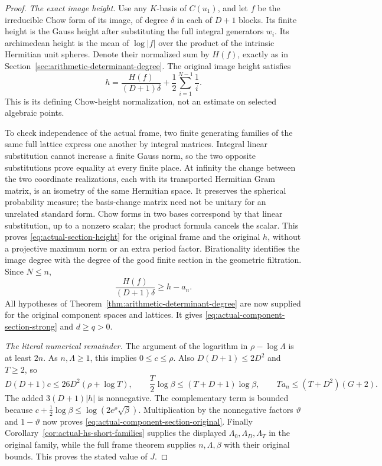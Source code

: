\begin{proof}
\emph{The exact image height.}
Use any $K$-basis of $C(u_1)$, and let $f$ be the irreducible Chow
form of its image, of degree $\delta$ in each of $D+1$ blocks.
Its finite height is the Gauss height after substituting the full
integral generators $w_i$.  Its archimedean height is the mean of
$\log|f|$ over the product of the intrinsic Hermitian unit spheres.
Denote their normalized sum by $H(f)$, exactly as in
Section~\ref{sec:arithmetic-determinant-degree}.  The original image
height satisfies
\begin{equation}\label{eq:actual-section-height}
       h=\frac{H(f)}{(D+1)\delta}
                   +\frac12\sum_{i=1}^{N-1}\frac1i .
\end{equation}
This is its defining Chow-height normalization, not an estimate on
selected algebraic points.

To check independence of the actual frame, two finite generating
families of the same full lattice express one another by integral
matrices.  Integral linear substitution cannot increase a finite
Gauss norm, so the two opposite substitutions prove equality at
every finite place.  At infinity the change between the two coordinate
realizations, each with its transported Hermitian Gram matrix, is
an isometry of the same Hermitian space.  It preserves the spherical
probability measure; the basis-change matrix need not be unitary
for an unrelated standard form.  Chow forms in two bases correspond by that
linear substitution, up to a nonzero scalar; the product formula
cancels the scalar.  This proves \eqref{eq:actual-section-height}
for the original frame and the original $h$, without a projective
maximum norm or an extra period factor.  Birationality identifies
the image degree with the degree of the good finite section in
the geometric filtration.  Since $N\le n$,
\[
        \frac{H(f)}{(D+1)\delta}\ge h-a_n.
\]
All hypotheses of Theorem~\ref{thm:arithmetic-determinant-degree}
are now supplied for the original component spaces and lattices.
It gives \eqref{eq:actual-component-section-strong} and $d\ge q>0$.

\emph{The literal numerical remainder.}
The argument of the logarithm in $\rho-\log\Lambda$ is at least
$2n$.  As $n,\Lambda\ge1$, this implies $0\le c\le\rho$.
Also $D(D+1)\le2D^2$ and $T\ge2$, so
\[
 D(D+1)c\le26D^2(\rho+\log T),\qquad
 \frac T2\log\beta\le(T+D+1)\log\beta,\qquad
 Ta_n\le(T+D^2)(G+2).
\]
The added $3(D+1)|h|$ is nonnegative.  The complementary term
is bounded because
$c+\tfrac12\log\beta\le
\log(2e^\rho\sqrt\beta)$.
Multiplication by the nonnegative factors $\vartheta$ and
$1-\vartheta$ now proves \eqref{eq:actual-component-section-original}.
Finally Corollary~\ref{cor:actual-hs-short-families} supplies the displayed
$\Lambda_0,\Lambda_D,\Lambda_T$ in the original family, while
the full frame theorem supplies $n,\Lambda,\beta$ with their
original bounds.  This proves the stated value of $J$.
\end{proof}

